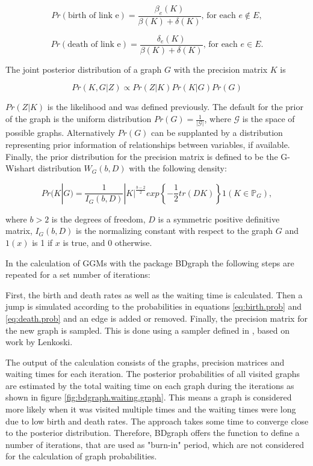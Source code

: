 \documentclass[a4paper,12pt,twoside,openright]{article}
\begin{document}
\begin{equation}
Pr(\text{birth of link e}) = \frac{\beta_e(K)}{\beta(K) + \delta(K)} \text{, for each } e \notin E,
\label{eq:birth.prob}
\end{equation}

\begin{equation}
Pr(\text{death of link e}) = \frac{\delta_e(K)}{\beta(K) + \delta(K)} \text{, for each } e \in E.
\label{eq:death.prob}
\end{equation}

The joint posterior distribution of a graph $G$ with the precision matrix $K$ is 

\begin{equation}
Pr(K,G|Z) \propto Pr(Z|K) Pr(K|G) Pr(G)
\end{equation}

$Pr(Z|K)$ is the likelihood and was defined previously. The default for the prior of the graph is the uniform distribution $Pr(G)=\frac{1}{|\mathcal{G}|}$, where $\mathcal{G}$ is the space of possible graphs. Alternatively $Pr(G)$ can be supplanted by a distribution representing prior information of relationships between variables, if available. Finally, the prior distribution for the precision matrix is defined to be the G-Wishart distribution $W_G(b,D)$ with the following density:

\begin{equation}
Pr(K|G) = \frac{1}{I_G(b,D)}|K|^{\frac{b-2}{2}}exp\left\lbrace-\frac{1}{2}tr(DK)\right\rbrace 1(K \in \mathbb{P}_G),
\end{equation}

where $b>2$ is the degrees of freedom, $D$ is a symmetric positive definitive matrix, $I_G(b,D)$ is the normalizing constant with respect to the graph $G$ and $1(x)$ is 1 if $x$ is true, and 0 otherwise.

In the calculation of GGMs with the package BDgraph the following steps are repeated for a set number of iterations:

First, the birth and death rates as well as the waiting time is calculated. Then a jump is simulated according to the probabilities in equations \ref{eq:birth.prob} and \ref{eq:death.prob} and an edge is added or removed. Finally, the precision matrix for the new graph is sampled. This is done using a sampler defined in \cite{Mohammadi2015}, based on work by Lenkoski\cite{Lenkoski2013}. 

The output of the calculation consists of the graphs, precision matrices and waiting times for each iteration. The posterior probabilities of all visited graphs are estimated by the total waiting time on each graph during the iterations as shown in figure \ref{fig:bdgraph.waiting.graph}. This means a graph is considered more likely when it was visited multiple times and the waiting times were long due to low birth and death rates. The approach takes some time to converge close to the posterior distribution. Therefore, BDgraph offers the function to define a number of iterations, that are used as "burn-in" period, which are not considered for the calculation of graph probabilities.  
\end{document}
